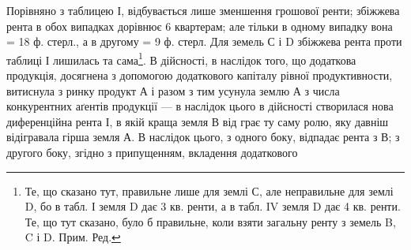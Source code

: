 Порівняно з таблицею І, відбувається лише зменшення грошової ренти;
збіжжева рента в обох випадках дорівнює 6 квартерам; але тільки в одному
випадку вона = 18 ф. стерл., а в другому = 9 ф. стерл. Для земель С і D
збіжжева рента проти таблиці І лишилась та сама\footnote*{
Те, що сказано тут, правильне лише для землі С, але неправильне для землі D, бо в табл. І земля
D дає 3 кв. ренти, а в табл. IV земля D дає 4 кв. ренти. Те, що тут сказано, було б правильне, коли
взяти загальну ренту з земель B, C і D. Прим. Ред.
}. В дійсності, в наслідок
того, що додаткова продукція, досягнена з допомогою додаткового капіталу рівної
продуктивности, витиснула з ринку продукт А і разом з тим усунула землю А
з числа конкурентних аґентів продукції — в наслідок цього в дійсності створилася
нова диференційна рента І, в якій краща земля В від грає ту саму ролю,
яку давніш відігравала гірша земля А. В наслідок цього, з одного боку, відпадає
рента з В; з другого боку, згідно з припущенням, вкладення додаткового